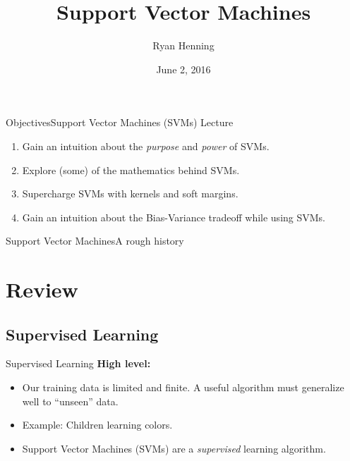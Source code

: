 \documentclass[xcolor=dvipsnames]{beamer}
\title[SVMs]
{Support Vector Machines}
\author
{Ryan Henning}
\institute
{
    Galvanize
}
\date
{June 2, 2016}
\begin{document}
\begin{frame}
    \titlepage
\end{frame}


\begin{frame}{Objectives}{Support Vector Machines (SVMs) Lecture}
    \begin{enumerate}
        \item Gain an intuition about the {\em purpose} and {\em power} of SVMs.
        \item<2-> Explore (some) of the mathematics behind SVMs.
        \item<3-> Supercharge SVMs with kernels and soft margins.
        \item<4-> Gain an intuition about the Bias-Variance tradeoff while using SVMs.
    \end{enumerate}
\end{frame}

\begin{frame}{Support Vector Machines}{A rough history}
\end{frame}


\section{Review}

\subsection{Supervised Learning}

\begin{frame}{Supervised Learning}
    \textbf{High level:} \\
    \vspace{2em}
    \vspace{0.5em}
    \begin{itemize}
        \item<3-> Our training data is limited and finite. A useful algorithm must generalize well to ``unseen'' data.
        \item<4-> Example: Children learning colors.
        \item<5-> Support Vector Machines (SVMs) are a {\em supervised} learning algorithm.
    \end{itemize}
\end{frame}
\end{document}
